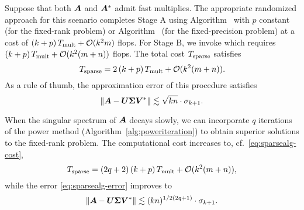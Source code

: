 \documentclass[12pt]{article}
\begin{document}
Suppose that both $\bm{A}$ and $\bm{A}^*$ admit fast multiplies.
The appropriate randomized approach for this scenario completes
Stage A using Algorithm~\cite[Algorithm~4.1]{RM} %
with $p$ constant
(for the fixed-rank problem)
or Algorithm~\cite[Algorithm 4.2]{RM} %
(for the fixed-precision problem)
at a cost of  $(k+p) \, T_{\rm mult} + \mathcal{O}(k^2 m)$ flops.
For Stage B, we invoke \cite[Algorithm~5.1]{RM} %
which
requires $(k+p) \, T_{\rm mult} + \mathcal{O}(k^2 (m + n))$ flops.
The total cost $T_{\rm sparse}$ satisfies
\begin{equation}
\label{eq:sparsealg-cost}
T_{\rm sparse} = 2\,(k + p)\, T_{\rm mult} + \mathcal{O}(k^2 (m + n)).
\end{equation}
As a rule of thumb, the approximation error of this procedure satisfies
\begin{equation}
\label{eq:sparsealg-error}
\left\Vert { \bm{A} - \bm{U\Sigma V}^*} \right\Vert \lesssim \sqrt{kn} \cdot \sigma_{k+1}.
\end{equation}


When the singular spectrum of $\bm{A}$ decays slowly,
we can incorporate $q$ iterations of the power method
(Algorithm~\ref{alg:poweriteration}) to obtain superior
solutions to the fixed-rank problem.
The computational cost increases to, cf.~\eqref{eq:sparsealg-cost},
\begin{equation}
\label{eq:sparsealg-cost2}
T_{\rm sparse} = (2q+2)\,(k + p) \, T_{\rm mult} + \mathcal{O}(k^2 (m + n)),
\end{equation}
while the error \eqref{eq:sparsealg-error} improves to
\begin{equation}
\label{eq:sparsealg-error2}
\left\Vert { \bm{A} - \bm{U\Sigma V}^*} \right\Vert \lesssim (kn)^{1/2(2q+1)} \cdot \sigma_{k+1}.
\end{equation}


\end{document}
